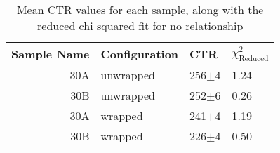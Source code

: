 \begin{table}
\caption{\label{tab:doiresults} Mean CTR values for each sample, along with the reduced chi squared fit for no relationship}
\begin{tabular}{rlll}
\hline
Sample Name & Configuration & CTR &  $\chi^2_\text{Reduced}$ \\
\hline
        30A &     unwrapped &  256$\pm$4 &                    1.24 \\
        30B &     unwrapped &  252$\pm$6 &                    0.26 \\
        30A &       wrapped &  241$\pm$4 &                    1.19 \\
        30B &       wrapped &  226$\pm$4 &                    0.50 \\
\hline
\end{tabular}
\end{table}